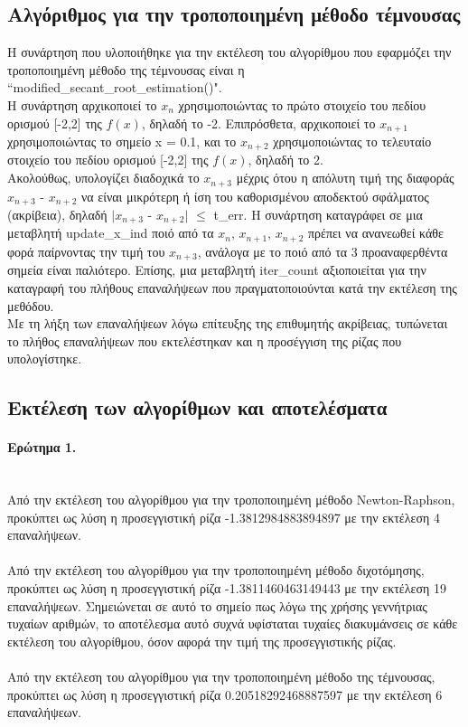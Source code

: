 \documentclass[a4paper,11pt]{article}
\newcommand{\lt}{\latintext}
\begin{document}
\subsection*{Αλγόριθμος για την τροποποιημένη μέθοδο τέμνουσας}
Η συνάρτηση που υλοποιήθηκε για την εκτέλεση του αλγορίθμου που εφαρμόζει την τροποποιημένη μέθοδο της τέμνουσας είναι η {\lt ``modified\_secant\_root\_estimation()"}. \\
Η συνάρτηση αρχικοποιεί το {$x_{n}$} χρησιμοποιώντας το πρώτο στοιχείο του πεδίου ορισμού [-2,2] της {\lt $f(x)$}, δηλαδή το -2. Επιπρόσθετα, αρχικοποιεί το {$x_{n+1}$} χρησιμοποιώντας το σημείο {\lt x = 0.1}, και το {$x_{n+2}$} χρησιμοποιώντας το τελευταίο στοιχείο του 	πεδίου ορισμού [-2,2] της {\lt $f(x)$}, δηλαδή το 2.\\
Ακολούθως, υπολογίζει διαδοχικά το {$x_{n+3}$} μέχρις ότου η απόλυτη τιμή της διαφοράς {$x_{n+3}$} - {$x_{n+2}$} να είναι μικρότερη ή ίση του καθορισμένου αποδεκτού σφάλματος (ακρίβεια), δηλαδή 
$|${$x_{n+3}$} - {$x_{n+2}$}$|$ {$\leq$} {\lt t\_err}. 
Η συνάρτηση καταγράφει σε μια μεταβλητή {\lt update\_x\_ind} ποιό από τα {$x_{n}$}, {$x_{n+1}$}, {$x_{n+2}$} πρέπει να ανανεωθεί κάθε φορά παίρνοντας την τιμή του {$x_{n+3}$}, ανάλογα με το ποιό από τα 3 προαναφερθέντα σημεία είναι παλιότερο. Επίσης, μια μεταβλητή {\lt iter\_count} αξιοποιείται για την καταγραφή του πλήθους επαναλήψεων που πραγματοποιούνται κατά την εκτέλεση της μεθόδου.\\
Με τη λήξη των επαναλήψεων λόγω επίτευξης της επιθυμητής ακρίβειας, τυπώνεται το πλήθος επαναλήψεων που εκτελέστηκαν και η προσέγγιση της ρίζας που υπολογίστηκε. 
\subsection*{Εκτέλεση των αλγορίθμων και αποτελέσματα}
\paragraph{Ερώτημα 1.}\mbox{}\\
Από την εκτέλεση του αλγορίθμου για την τροποποιημένη μέθοδο {\lt Newton-Raphson}, προκύπτει ως λύση η προσεγγιστική ρίζα -1.3812984883894897 με την εκτέλεση 4 επαναλήψεων.\\
\\Από την εκτέλεση του αλγορίθμου για την τροποποιημένη μέθοδο διχοτόμησης, προκύπτει ως λύση η προσεγγιστική ρίζα -1.3811460463149443 με την εκτέλεση 19 επαναλήψεων. Σημειώνεται σε αυτό το σημείο πως λόγω της χρήσης γεννήτριας τυχαίων αριθμών, το αποτέλεσμα αυτό συχνά υφίσταται τυχαίες διακυμάνσεις σε κάθε εκτέλεση του αλγορίθμου, όσον αφορά την τιμή της προσεγγιστικής ρίζας.\\
\\Από την εκτέλεση του αλγορίθμου για την τροποποιημένη μέθοδο της τέμνουσας, προκύπτει ως λύση η προσεγγιστική ρίζα 0.20518292468887597 με την εκτέλεση 6 επαναλήψεων.
\end{document}
